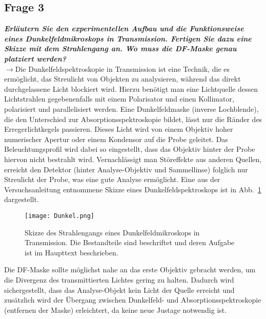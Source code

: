 \subsection{\label{subsec:FZV3}Frage 3}
\textbf{\textit{Erläutern Sie den experimentellen Aufbau und die Funktionsweise eines Dunkelfeldmikroskops
in Transmission. Fertigen Sie dazu eine Skizze mit dem Strahlengang an. 
Wo muss die DF-Maske genau platziert werden?}} \\
$\rightarrow$Die Dunkelfeldspektroskopie in Transmission ist eine Technik, die es ermöglicht, das Streulicht von Objekten zu analysieren, 
während das direkt durchgelassene Licht blockiert wird. Hierzu benötigt man eine Lichtquelle dessen Lichtstrahlen 
gegebenenfalls mit einem Polarisator und einen Kollimator, polarisiert und parallelisiert werden.
Eine Dunkelfeldmaske (inverse Lochblende), die den Unterschied zur Absorptionsspektroskopie bildet, lässt nur 
die Ränder des Erregerlichtkegels passieren. 
Dieses Licht wird von einem Objektiv hoher numerischer Apertur oder einem Kondensor auf die Probe geleitet. 
Das Beleuchtungsprofil wird dabei so eingestellt, dass das Objektiv hinter der Probe hiervon 
nicht bestrahlt wird. Vernachlässigt man Störeffekte aus anderen Quellen, erreicht den Detektor 
(hinter Analyse-Objektiv und Sammellinse) folglich nur
Streulicht der Probe, was eine gute Analyse ermöglicht.
Eine aus der Versuchsanleitung \cite{Anleitung} entnommene Skizze eines Dunkelfeldspektroskops 
ist in Abb.~\ref{fig:aufbau} dargestellt. 
\begin{figure}[h!]
    \centering
    \texttt{[image: Dunkel.png]}
    \caption{\label{fig:aufbau}Skizze des Strahlengangs eines Dunkelfeldmikroskops in Transmission.
    Die Bestandteile sind beschriftet und deren Aufgabe ist im Haupttext beschrieben.}
\end{figure}\FloatBarrier
Die DF-Maske sollte möglichst nahe an das erste Objektiv gebracht werden, um die Divergenz des 
transmittierten Lichtes gering zu halten. Dadurch wird sichergestellt, dass das Analyse-Objekt
kein Licht der Quelle erreicht und zusätzlich wird der Übergang zwischen Dunkelfeld- und 
Absorptionsspektroskopie (entfernen der Maske) erleichtert, da keine neue Justage notwendig ist. 

